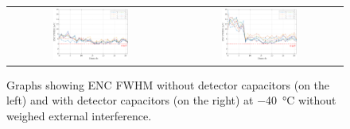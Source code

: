 \begin{figure}[h!]
    \centering
    \begin{tabular}{cc}
         \includegraphics[width=0.475\textwidth]{Images/chap1/results/ENC_minus40C/ASIC_cold_wocaps_wo_fit.pdf} &  \includegraphics[width=0.475\textwidth]{Images/chap1/results/ENC_minus40C/ASIC_cold_wcaps_wo_fit.pdf} \\
    \end{tabular}
    \caption{Graphs showing ENC FWHM without detector capacitors (on the left) and with detector capacitors (on the right) at \SI{-40}{\celsius} without weighed external interference.}
    \label{figENCwofit}
\end{figure}